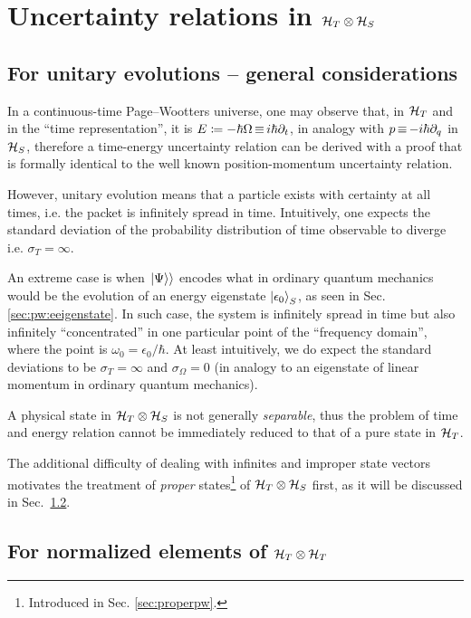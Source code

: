 \section{Uncertainty relations in $\mathcal{H}_T \otimes \mathcal{H}_S$}\label{sec:pw:uncertainty}

\subsection{For unitary evolutions -- general considerations}

In a continuous-time Page--Wootters universe,
one may observe that,
in $\mathcal{H}_T$ and in the ``time representation'',
it is $E \coloneqq -\hbar{\Omega} \operatorname*{\equiv} i\hbar\partial_{t}$,
in analogy with ${p} \operatorname*{\equiv} -i\hbar\partial_{q}$ in $\mathcal{H}_S$,
therefore a time-energy uncertainty relation can be derived
with a proof that is formally identical to the well known
position-momentum uncertainty relation.

However, unitary evolution means that a particle exists with
certainty at all times, i.e. the packet
is infinitely spread in time.
Intuitively,
one expects the standard deviation
of the probability distribution of time observable
to diverge i.e.
$\sigma_T = \infty$.

An extreme case is when $\left.\left| \Psi \right\rangle\right\rangle$ encodes what in ordinary quantum mechanics would be the evolution
of an energy eigenstate $\ket{\epsilon_0}_S$, as seen in Sec. \ref{sec:pw:eeigenstate}.
In such case, the system is infinitely spread in time but also infinitely
``concentrated'' in one particular point of the ``frequency domain'',
where the point is $\omega_0 = \epsilon_{0}/\hbar$.
At least intuitively, we do expect the standard deviations to be $\sigma_T = \infty$
and $\sigma_{\Omega} = 0$
(in analogy to an eigenstate of linear momentum in ordinary quantum mechanics).

A physical state in $\mathcal{H}_T \otimes \mathcal{H}_S$ is not generally
\emph{separable},
thus
the problem of time and energy relation cannot be immediately reduced to that of
a pure state in $\mathcal{H}_T$.

The additional difficulty of dealing with infinites and improper state vectors
motivates the treatment of \emph{proper} states\footnote{
  Introduced in Sec. \ref{sec:properpw}.
}
of $\mathcal{H}_T \otimes \mathcal{H}_S$
first, as it will be discussed in Sec.~\ref{sec:for-normalized-elements}.

\subsection{For normalized elements of $\mathcal{H}_T \otimes \mathcal{H}_T$}\label{sec:for-normalized-elements}

